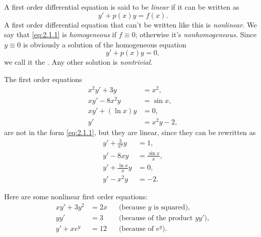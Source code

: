 A first order differential equation is said to be \emph{\color{blue}linear} if it
can be written as
\begin{equation}\label{eq:2.1.1}
y'+p(x)y=f(x).
\end{equation}
A first order differential equation that can't be written like this is
\emph{\color{blue}nonlinear}.
We say that \eqref{eq:2.1.1} is 
\emph{\color{blue}homogeneous}
if $f\equiv0$;     otherwise it's
\emph{\color{blue}nonhomogeneous}.
Since $y\equiv0$ is obviously a solution of the homogeneous equation
\[
y'+p(x)y=0,
\]
we call it the . Any  other solution
is \emph{\color{blue}nontrivial}.


\begin{example}\label{example:2.1.1}
 The first order equations
\begin{align*}
x^2y'+3y&=x^2,\\
xy'-8x^2y&=\sin x,\\
xy'+(\ln x)y&=0,\\
y'&=x^2y - 2,
\end{align*}
are not in the form \eqref{eq:2.1.1}, but they are linear, since they can
be rewritten as
\begin{align*}
y'+\frac{3}{x^2}y&=1,\\
y'-8xy&=\frac{\sin x}{x},\\
y'+\frac{\ln x}{x}y&=0,\\
y'-x^2y&=-2.
\end{align*}
\end{example}

\begin{example}\label{example:2.1.2}
Here are some
nonlinear first order equations:
\begin{align*}
xy'+3y^2 & = 2x&&\text{(because $y$ is squared)},\\
yy'& =3&&\text{(because of the product $yy'$)},\\
y'+xe^y &=12&&\text{(because of $e^y$)}.
\end{align*}
\end{example}

